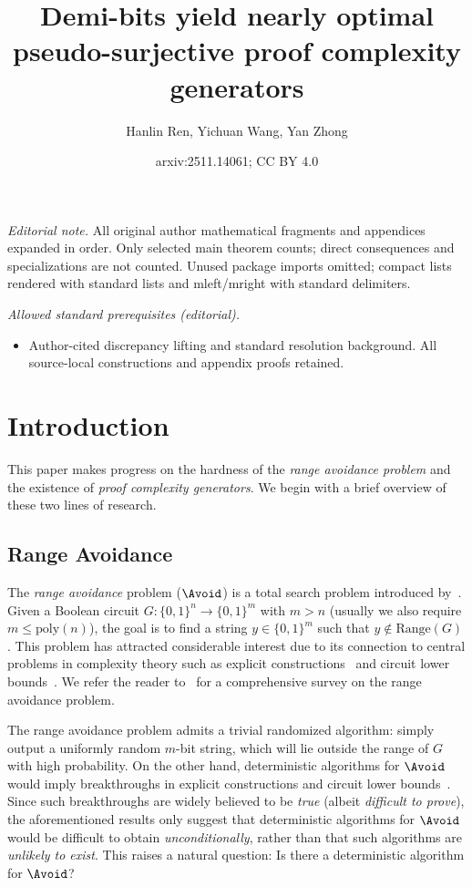 \documentclass[10pt,a4paper]{article}
\title{Demi-bits yield nearly optimal pseudo-surjective proof complexity generators}
\author{Hanlin Ren, Yichuan Wang, Yan Zhong}
\date{arxiv:2511.14061; CC BY 4.0}
\theoremstyle{definition}
\theoremstyle{remark}
\renewcommand{\poly}{\mathrm{poly}}
\newcommand{\Range}{\mathrm{Range}}
\begin{document}
\maketitle
\noindent\textit{Editorial note.} All original author mathematical fragments and appendices expanded in order. Only selected main theorem counts; direct consequences and specializations are not counted. Unused package imports omitted; compact lists rendered with standard lists and mleft/mright with standard delimiters.\par\medskip
\noindent\textit{Allowed standard prerequisites (editorial).}\begin{itemize}
\item Author-cited discrepancy lifting and standard resolution background. All source-local constructions and appendix proofs retained.
\end{itemize}\medskip
\section{Introduction}







This paper makes progress on the hardness of the \emph{range avoidance problem} and the existence of \emph{proof complexity generators}. We begin with a brief overview of these two lines of research.




\subsection{Range Avoidance}
The \emph{range avoidance} problem ($\Avoid$) is a total search problem introduced by~\cite{KKMP21,Korten21,RenSW22}. Given a Boolean circuit $G: \{0,1\}^n \rightarrow \{0,1\}^m$ with $m > n$ (usually we also require $m\leq\poly(n)$), the goal is to find a string $y \in \{0,1\}^m$ such that $y \not\in \Range(G)$. This problem has attracted considerable interest due to its connection to central problems in complexity theory such as explicit constructions~\cite{Korten21, RenSW22, ChenHLR23, GuruswamiLW22, GajulapalliGNS23} and circuit lower bounds~\cite{Korten21, CHR24, Li24, KortenP24}. We refer the reader to~\cite{Korten-EATCS} for a comprehensive survey on the range avoidance problem. %

The range avoidance problem admits a trivial randomized algorithm: simply output a uniformly random $m$-bit string, which will lie outside the range of $G$ with high probability. On the other hand, deterministic algorithms for $\Avoid$ would imply breakthroughs in explicit constructions and circuit lower bounds~\cite{Korten21, RenSW22, GuruswamiLW22, GajulapalliGNS23}. Since such breakthroughs are widely believed to be \emph{true} (albeit \emph{difficult to prove}), the aforementioned results only suggest that deterministic algorithms for $\Avoid$ would be difficult to obtain \emph{unconditionally}, rather than that such algorithms are \emph{unlikely to exist}. This raises a natural question: Is there a deterministic algorithm for $\Avoid$?
\end{document}
